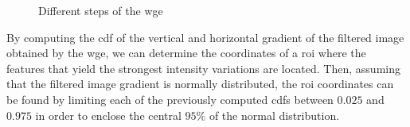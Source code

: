 \begin{figure}[htbp]
  \centering
  \qquad
  \qquad
  \qquad
  \caption{Different steps of the \acrshort{wge}}
  \label{fig:wgeSteps}
\end{figure}

By computing the \acrfull{cdf} of the vertical and horizontal gradient of the filtered image obtained by the \acrshort{wge}, we can determine the coordinates of a \acrshort{roi} where the features that yield the strongest intensity variations are located. Then, assuming that the filtered image gradient is normally distributed, the \acrshort{roi} coordinates can be found by limiting each of the previously computed \acrshort{cdf}s between $0.025$ and $0.975$ in order to enclose the central $95\%$ of the normal distribution.

